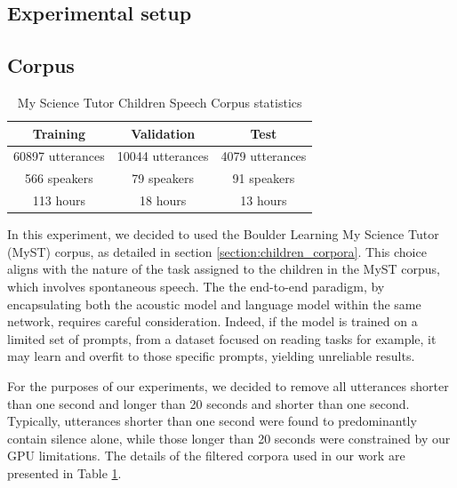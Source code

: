 \subsection{Experimental setup}
\label{section:methods}

\subsection{Corpus}
\begin{table}[ht]
\centering
\begin{tabular}{c|c|c}
\hline
 Training & Validation     & Test   \\ \hline
60897 utterances  & 10044 utterances   & 4079 utterances \\ 
 566 speakers  & 79 speakers   & 91 speakers \\ 
 113 hours  & 18 hours   & 13 hours \\ \hline

\end{tabular}
\caption{My Science Tutor Children Speech Corpus statistics}
\label{tab:statistics_myst}
\end{table}
In this experiment, we decided to used  the Boulder Learning My Science Tutor (MyST) corpus, as detailed in section \ref{section:children_corpora}. This choice aligns with the nature of the task assigned to the children in the MyST corpus, which involves spontaneous speech. The the end-to-end paradigm, by encapsulating both the acoustic model and language model within the same network, requires careful consideration. Indeed, if the model is trained on a limited set of prompts, from a dataset focused on reading tasks for example, it may learn and overfit to those specific prompts, yielding unreliable results.

For the purposes of our experiments, we decided to remove all utterances shorter than one second and longer than 20 seconds and shorter than one second. Typically, utterances shorter than one second were found to predominantly contain silence alone, while those longer than 20 seconds were constrained by our GPU limitations. The details of the filtered corpora used in our work are presented in Table \ref{tab:statistics_myst}. 

